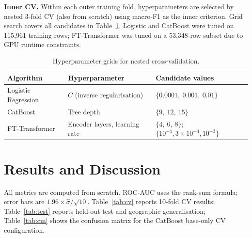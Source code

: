 \documentclass[10pt,a4paper]{article}
\newcommand{\reporttabcolsep}{4pt}
\begin{document}
\textbf{Inner CV.} Within each outer training fold, hyperparameters are selected
by nested 3-fold CV (also from scratch) using macro-F1 as the inner criterion.
Grid search covers all candidates in Table~\ref{tab:hpgrid}. Logistic and
CatBoost were tuned on 115{,}961 training rows; FT-Transformer was tuned on a
53{,}348-row subset due to GPU runtime constraints.

\begin{table}[H]
\centering\small
\setlength{\tabcolsep}{\reporttabcolsep}
\begin{tabular}{lll}
\toprule
Algorithm & Hyperparameter & Candidate values \\
\midrule
Logistic Regression & $C$ (inverse regularisation) & $\{0.0001,\ 0.001,\ 0.01\}$ \\
CatBoost            & Tree depth                   & $\{9,\ 12,\ 15\}$           \\
FT-Transformer      & Encoder layers, learning rate
& $\{4,\ 6,\ 8\}$; $\{10^{-4},3{\times}10^{-4},10^{-3}\}$ \\
\bottomrule
\end{tabular}
\caption{Hyperparameter grids for nested cross-validation.}
\label{tab:hpgrid}
\end{table}

\section{Results and Discussion}

All metrics are computed from scratch. ROC-AUC uses the rank-sum formula;
error bars are $1.96\times\hat\sigma/\sqrt{10}$.
Table~\ref{tab:cv} reports 10-fold CV results; Table~\ref{tab:test} reports
held-out test and geographic generalisation; Table~\ref{tab:cm} shows the
confusion matrix for the CatBoost base-only CV configuration.
\end{document}
